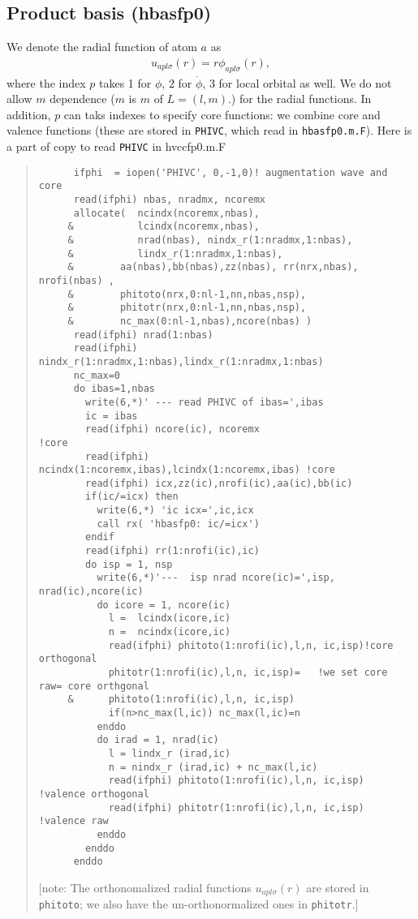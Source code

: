 \documentclass[a4paper,10pt,fleqn]{article}
\begin{document}
\subsection{Product basis (hbasfp0)}
\label{sec. PB}

We denote the radial function of atom $a$ as
\begin{eqnarray}
   u_{apl\sigma}(r) = r \phi_{apl\sigma}(r),
\end{eqnarray}
where the index $p$ takes 1 for $\phi$, 2 for $\dot{\phi}$,
3 for local orbital as well. We do not allow $m$ dependence
($m$ is $m$ of $L=(l,m)$.) for the radial functions.
In addition, $p$ can taks indexes to specify core functions:
we combine core and valence functions (these
are stored in \verb|PHIVC|, which read in \verb#hbasfp0.m.F#). 
Here is a part of copy to read \verb#PHIVC# in hvccfp0.m.F
\begin{quote}
{\baselineskip=3mm
\begin{verbatim}
      ifphi  = iopen('PHIVC', 0,-1,0)! augmentation wave and core
      read(ifphi) nbas, nradmx, ncoremx
      allocate(  ncindx(ncoremx,nbas),
     &           lcindx(ncoremx,nbas),
     &           nrad(nbas), nindx_r(1:nradmx,1:nbas),
     &           lindx_r(1:nradmx,1:nbas),
     &        aa(nbas),bb(nbas),zz(nbas), rr(nrx,nbas), nrofi(nbas) ,
     &        phitoto(nrx,0:nl-1,nn,nbas,nsp),
     &        phitotr(nrx,0:nl-1,nn,nbas,nsp),
     &        nc_max(0:nl-1,nbas),ncore(nbas) )
      read(ifphi) nrad(1:nbas)
      read(ifphi) nindx_r(1:nradmx,1:nbas),lindx_r(1:nradmx,1:nbas)
      nc_max=0
      do ibas=1,nbas
        write(6,*)' --- read PHIVC of ibas=',ibas
        ic = ibas
        read(ifphi) ncore(ic), ncoremx                            !core
        read(ifphi) ncindx(1:ncoremx,ibas),lcindx(1:ncoremx,ibas) !core
        read(ifphi) icx,zz(ic),nrofi(ic),aa(ic),bb(ic)
        if(ic/=icx) then
          write(6,*) 'ic icx=',ic,icx
          call rx( 'hbasfp0: ic/=icx')
        endif
        read(ifphi) rr(1:nrofi(ic),ic)
        do isp = 1, nsp
          write(6,*)'---  isp nrad ncore(ic)=',isp, nrad(ic),ncore(ic)
          do icore = 1, ncore(ic)
            l =  lcindx(icore,ic)
            n =  ncindx(icore,ic)
            read(ifphi) phitoto(1:nrofi(ic),l,n, ic,isp)!core orthogonal
            phitotr(1:nrofi(ic),l,n, ic,isp)=   !we set core raw= core orthgonal
     &      phitoto(1:nrofi(ic),l,n, ic,isp)       
            if(n>nc_max(l,ic)) nc_max(l,ic)=n
          enddo
          do irad = 1, nrad(ic)
            l = lindx_r (irad,ic)
            n = nindx_r (irad,ic) + nc_max(l,ic)
            read(ifphi) phitoto(1:nrofi(ic),l,n, ic,isp) !valence orthogonal
            read(ifphi) phitotr(1:nrofi(ic),l,n, ic,isp) !valence raw
          enddo
        enddo
      enddo
\end{verbatim}
}
[note: The orthonomalized radial functions $u_{apl\sigma}(r)$
are stored in \verb#phitoto#; we also have the un-orthonormalized ones in \verb#phitotr#.]
\end{quote}
\end{document}
